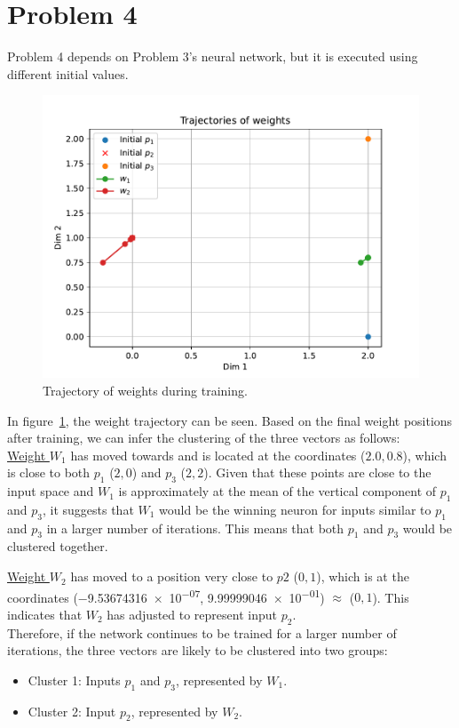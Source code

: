 \section{Problem 4}
Problem 4 depends on Problem 3's neural network, but it is executed using different initial values.

\begin{figure}[htpb]
	\centering
	\includegraphics[width=0.5\linewidth]{../Problem 4/prob4_weights_over_epoch.pdf}
	\caption{Trajectory of weights during training.}
	\label{fig:prob4_weight_trajectory}
\end{figure}

In figure~\ref{fig:prob4_weight_trajectory}, the weight trajectory can be seen.
Based on the final weight positions after training, we can infer the clustering of the three vectors as follows:\\

\underline{Weight $W_1$} has moved towards and is located at the coordinates ($2.0, 0.8$), which is close to both $p_1$ ($2, 0$) and $p_3$ ($2, 2$). Given that these points are close to the input space and $W_1$ is approximately at the mean of the vertical component of $p_1$ and $p_3$, it suggests that $W_1$ would be the winning neuron for inputs similar to $p_1$ and $p_3$ in a larger number of iterations. This means that both $p_1$ and $p_3$ would be clustered together.

\underline{Weight $W_2$} has moved to a position very close to $p2$ ($0, 1$), which is at the coordinates (\num{-9.53674316e-07}, \num{9.99999046e-01}) $\approx$ ($0,1$). This indicates that $W_2$ has adjusted to represent input $p_2$.\\

Therefore, if the network continues to be trained for a larger number of iterations, the three vectors are likely to be clustered into two groups:

\begin{itemize}
	\item Cluster 1: Inputs $p_1$ and $p_3$, represented by $W_1$.
	\item Cluster 2: Input $p_2$, represented by $W_2$.
\end{itemize}
\vspace{3mm}
